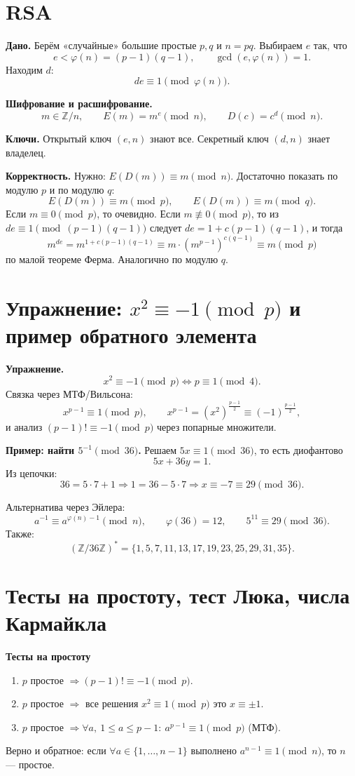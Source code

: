 \documentclass[12pt,a4paper]{article}
\newcommand{\Z}{\mathbb{Z}}
\DeclareMathOperator{\gcdop}{gcd}
\begin{document}
\section{RSA}

\textbf{Дано.}
Берём «случайные» большие простые $p,q$ и $n=pq$.
Выбираем $e$ так, что
\[
e<\varphi(n)=(p-1)(q-1),\qquad \gcdop(e,\varphi(n))=1.
\]
Находим $d$:
\[
de\equiv 1 \pmod{\varphi(n)}.
\]

\textbf{Шифрование и расшифрование.}
\[
m\in \Z/n,\qquad E(m)=m^e\pmod n,\qquad D(c)=c^d\pmod n.
\]

\textbf{Ключи.}
Открытый ключ $(e,n)$ знают все. Секретный ключ $(d,n)$ знает владелец.

\textbf{Корректность.}
Нужно: $E(D(m))\equiv m\pmod n$.
Достаточно показать по модулю $p$ и по модулю $q$:
\[
E(D(m))\equiv m\pmod p,\qquad E(D(m))\equiv m\pmod q.
\]
Если $m\equiv 0\pmod p$, то очевидно.
Если $m\not\equiv 0\pmod p$, то из $de\equiv 1\pmod{(p-1)(q-1)}$ следует
$de=1+c(p-1)(q-1)$, и тогда
\[
m^{de}=m^{1+c(p-1)(q-1)} \equiv m\cdot (m^{p-1})^{c(q-1)}\equiv m \pmod p
\]
по малой теореме Ферма. Аналогично по модулю $q$.

\section{Упражнение: $x^2\equiv -1\pmod p$ и пример обратного элемента}

\textbf{Упражнение.}
\[
x^2\equiv -1\pmod p \iff p\equiv 1\pmod 4.
\]
Связка через МТФ/Вильсона:
\[
x^{p-1}\equiv 1\pmod p,\qquad
x^{p-1}=(x^2)^{\frac{p-1}{2}}\equiv (-1)^{\frac{p-1}{2}},
\]
и анализ $(p-1)!\equiv -1\pmod p$ через попарные множители.

\textbf{Пример: найти $5^{-1}\pmod{36}$.}
Решаем $5x\equiv 1\pmod{36}$, то есть диофантово
\[
5x+36y=1.
\]
Из цепочки:
\[
36=5\cdot 7+1 \Rightarrow 1=36-5\cdot 7
\Rightarrow x\equiv -7\equiv 29\pmod{36}.
\]

Альтернатива через Эйлера:
\[
a^{-1}\equiv a^{\varphi(n)-1}\pmod n,\qquad \varphi(36)=12,\qquad 5^{11}\equiv 29\pmod{36}.
\]
Также:
\[
(\Z/36\Z)^{\ast}=\{1,5,7,11,13,17,19,23,25,29,31,35\}.
\]

\section{Тесты на простоту, тест Люка, числа Кармайкла}

\textbf{Тесты на простоту}
\begin{enumerate}
  \item $p$ простое $\Rightarrow (p-1)!\equiv -1\pmod p$.
  \item $p$ простое $\Rightarrow$ все решения $x^2\equiv 1\pmod p$ это $x\equiv \pm 1$.
  \item $p$ простое $\Rightarrow \forall a,\ 1\le a\le p-1:\ a^{p-1}\equiv 1\pmod p$ (МТФ).
\end{enumerate}
Верно и обратное:
если $\forall a\in\{1,\dots,n-1\}$ выполнено $a^{n-1}\equiv 1\pmod n$, то $n$ — простое.
\end{document}
